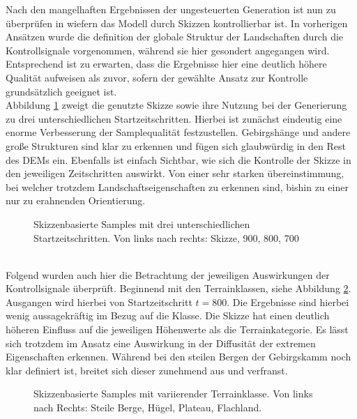 Nach den mangelhaften Ergebnissen der ungesteuerten Generation ist nun zu überprüfen in wiefern das Modell durch Skizzen kontrollierbar ist. In vorherigen Ansätzen wurde die definition der globale Struktur der Landschaften durch die Kontrollsignale vorgenommen, während sie hier gesondert angegangen wird. Entsprechend ist zu erwarten, dass die Ergebnisse hier eine deutlich höhere Qualität aufweisen als zuvor, sofern der gewählte Ansatz zur Kontrolle grundsätzlich geeignet ist. \\
Abbildung \ref{fig:sketch_strengths} zweigt die genutzte Skizze sowie ihre Nutzung bei der Generierung zu drei unterschiedlichen Startzeitschritten. Hierbei ist zunächst eindeutig eine enorme Verbesserung der Samplequalität festzustellen. Gebirgshänge und andere große Strukturen sind klar zu erkennen und fügen sich glaubwürdig in den Rest des DEMs ein. Ebenfalls ist einfach Sichtbar, wie sich die Kontrolle der Skizze in den jeweiligen Zeitschritten auswirkt. Von einer sehr starken übereinstimmung, bei welcher trotzdem Landschaftseigenschaften zu erkennen sind, bishin zu einer nur zu erahnenden Orientierung.  
\begin{figure}[htbp]
    \centering
    \caption{Skizzenbasierte Samples mit drei unterschiedlichen Startzeitschritten. Von links nach rechts: Skizze, 900, 800, 700}
    \label{fig:sketch_strengths}
\end{figure} \\
Folgend wurden auch hier die Betrachtung der jeweiligen Auswirkungen der Kontrollsignale überprüft. Beginnend mit den Terrainklassen, siehe Abbildung \ref{fig:sketch_terrains}. Ausgangen wird hierbei von Startzeitschritt $t=800$. Die Ergebnisse sind hierbei wenig aussagekräftig im Bezug auf die Klasse. Die Skizze hat einen deutlich höheren Einfluss auf die jeweiligen Höhenwerte als die Terrainkategorie. Es lässt sich trotzdem im Ansatz eine Auswirkung in der Diffusität der extremen Eigenschaften erkennen. Während bei den steilen Bergen der Gebirgskamm noch klar definiert ist, breitet sich dieser zunehmend aus und verfranst.  
\begin{figure}[htbp]
    \centering
    \caption{Skizzenbasierte Samples mit variierender Terrainklasse. Von links nach Rechts: Steile Berge, Hügel, Plateau, Flachland.}
    \label{fig:sketch_terrains}
\end{figure} \\
